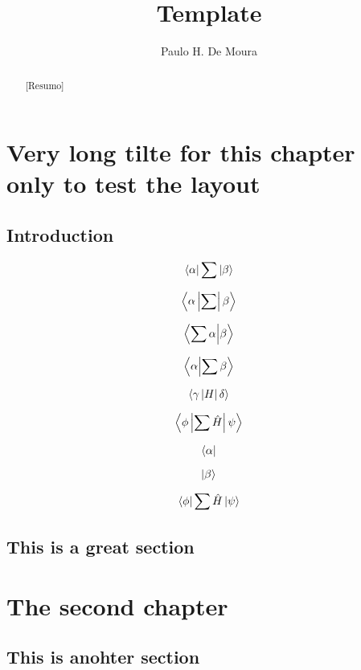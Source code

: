 \documentclass[A4paper,oneside, 12pt]{ifgw}
\title{Template}
\author{Paulo H. De Moura}
\begin{document}
\frontmatter
\maketitle
\tableofcontents

\begin{abstract}[Resumo]
\lipsum[1-3]
\end{abstract}

\begin{abstract}
\lipsum[1-3]
\end{abstract}

\mainmatter

\chapter{Very long tilte for this chapter only to test the layout}
\lipsum[1]

\section{Introduction}
\lipsum[2]
\begin{equation}
\left\langle\alpha\right|\sum\left|\beta\right\rangle
\end{equation}

\begin{equation}
\braket[\sum]{\alpha}{\beta}
\end{equation}

\begin{equation}
\braket{\sum\alpha}{\beta}
\end{equation}

\lipsum[3]

\begin{equation}
\braket{\alpha}{\sum\beta}
\end{equation}

\begin{equation}
\braket[H]{\gamma}{\delta}
\end{equation}

\begin{equation}
\braket[\sum\hat{H}]{\phi}{\psi}
\end{equation}

\begin{equation}
\left\langle\alpha\right|
\end{equation}

\begin{equation}
\left|\beta\right\rangle
\end{equation}

\begin{equation}
\left\langle\phi\right|\sum\hat{H}\left|\psi\right\rangle
\end{equation}

\lipsum[4-5]
\section{This is a great section}
\lipsum[6-8]

\chapter{The second chapter}
\lipsum[9-10]

\section{This is anohter section}
\lipsum[11-15]
\end{document}
